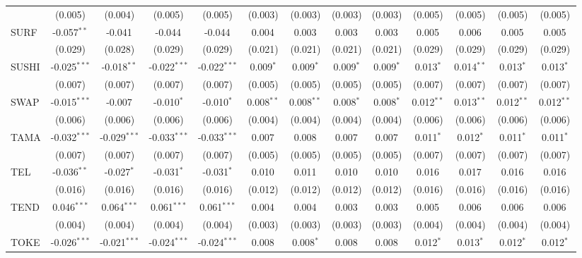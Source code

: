 \begin{table}[!htbp]
\begin{tabular}{@{\extracolsep{5pt}}lcccccccccccc}
  & (0.005) & (0.004) & (0.005) & (0.005) & (0.003) & (0.003) & (0.003) & (0.003) & (0.005) & (0.005) & (0.005) & (0.005) \\
 SURF & -0.057$^{**}$ & -0.041$^{}$ & -0.044$^{}$ & -0.044$^{}$ & 0.004$^{}$ & 0.003$^{}$ & 0.003$^{}$ & 0.003$^{}$ & 0.005$^{}$ & 0.006$^{}$ & 0.005$^{}$ & 0.005$^{}$ \\
  & (0.029) & (0.028) & (0.029) & (0.029) & (0.021) & (0.021) & (0.021) & (0.021) & (0.029) & (0.029) & (0.029) & (0.029) \\
 SUSHI & -0.025$^{***}$ & -0.018$^{**}$ & -0.022$^{***}$ & -0.022$^{***}$ & 0.009$^{*}$ & 0.009$^{*}$ & 0.009$^{*}$ & 0.009$^{*}$ & 0.013$^{*}$ & 0.014$^{**}$ & 0.013$^{*}$ & 0.013$^{*}$ \\
  & (0.007) & (0.007) & (0.007) & (0.007) & (0.005) & (0.005) & (0.005) & (0.005) & (0.007) & (0.007) & (0.007) & (0.007) \\
 SWAP & -0.015$^{***}$ & -0.007$^{}$ & -0.010$^{*}$ & -0.010$^{*}$ & 0.008$^{**}$ & 0.008$^{**}$ & 0.008$^{*}$ & 0.008$^{*}$ & 0.012$^{**}$ & 0.013$^{**}$ & 0.012$^{**}$ & 0.012$^{**}$ \\
  & (0.006) & (0.006) & (0.006) & (0.006) & (0.004) & (0.004) & (0.004) & (0.004) & (0.006) & (0.006) & (0.006) & (0.006) \\
 TAMA & -0.032$^{***}$ & -0.029$^{***}$ & -0.033$^{***}$ & -0.033$^{***}$ & 0.007$^{}$ & 0.008$^{}$ & 0.007$^{}$ & 0.007$^{}$ & 0.011$^{*}$ & 0.012$^{*}$ & 0.011$^{*}$ & 0.011$^{*}$ \\
  & (0.007) & (0.007) & (0.007) & (0.007) & (0.005) & (0.005) & (0.005) & (0.005) & (0.007) & (0.007) & (0.007) & (0.007) \\
 TEL & -0.036$^{**}$ & -0.027$^{*}$ & -0.031$^{*}$ & -0.031$^{*}$ & 0.010$^{}$ & 0.011$^{}$ & 0.010$^{}$ & 0.010$^{}$ & 0.016$^{}$ & 0.017$^{}$ & 0.016$^{}$ & 0.016$^{}$ \\
  & (0.016) & (0.016) & (0.016) & (0.016) & (0.012) & (0.012) & (0.012) & (0.012) & (0.016) & (0.016) & (0.016) & (0.016) \\
 TEND & 0.046$^{***}$ & 0.064$^{***}$ & 0.061$^{***}$ & 0.061$^{***}$ & 0.004$^{}$ & 0.004$^{}$ & 0.003$^{}$ & 0.003$^{}$ & 0.005$^{}$ & 0.006$^{}$ & 0.006$^{}$ & 0.006$^{}$ \\
  & (0.004) & (0.004) & (0.004) & (0.004) & (0.003) & (0.003) & (0.003) & (0.003) & (0.004) & (0.004) & (0.004) & (0.004) \\
 TOKE & -0.026$^{***}$ & -0.021$^{***}$ & -0.024$^{***}$ & -0.024$^{***}$ & 0.008$^{}$ & 0.008$^{*}$ & 0.008$^{}$ & 0.008$^{}$ & 0.012$^{*}$ & 0.013$^{*}$ & 0.012$^{*}$ & 0.012$^{*}$ \\

\end{tabular}
\end{table}
